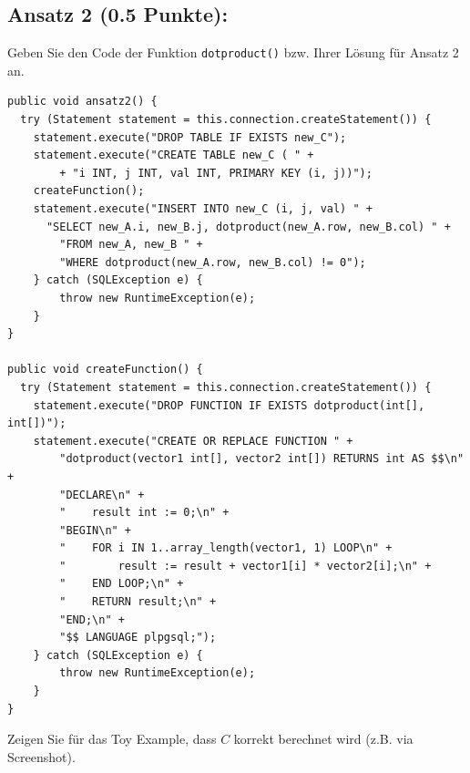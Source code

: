 \documentclass[11pt]{scrartcl}
\begin{document}
\subsection*{Ansatz 2 (0.5 Punkte):}

Geben Sie den Code der Funktion \texttt{dotproduct()} bzw. Ihrer Lösung für Ansatz 2 an.

\begin{lstlisting}[style=dmrsql]
public void ansatz2() {
  try (Statement statement = this.connection.createStatement()) {
    statement.execute("DROP TABLE IF EXISTS new_C");
    statement.execute("CREATE TABLE new_C ( " +
        + "i INT, j INT, val INT, PRIMARY KEY (i, j))");
    createFunction();
    statement.execute("INSERT INTO new_C (i, j, val) " +
      "SELECT new_A.i, new_B.j, dotproduct(new_A.row, new_B.col) " +
        "FROM new_A, new_B " +
        "WHERE dotproduct(new_A.row, new_B.col) != 0");
    } catch (SQLException e) {
        throw new RuntimeException(e);
    }
}

public void createFunction() {
  try (Statement statement = this.connection.createStatement()) {
    statement.execute("DROP FUNCTION IF EXISTS dotproduct(int[], int[])");
    statement.execute("CREATE OR REPLACE FUNCTION " +
        "dotproduct(vector1 int[], vector2 int[]) RETURNS int AS $$\n" +
        "DECLARE\n" +
        "    result int := 0;\n" +
        "BEGIN\n" +
        "    FOR i IN 1..array_length(vector1, 1) LOOP\n" +
        "        result := result + vector1[i] * vector2[i];\n" +
        "    END LOOP;\n" +
        "    RETURN result;\n" +
        "END;\n" +
        "$$ LANGUAGE plpgsql;");
    } catch (SQLException e) {
        throw new RuntimeException(e);
    }
}
\end{lstlisting}

Zeigen Sie für das Toy Example, dass $C$ korrekt berechnet wird (z.B. via Screenshot).
\end{document}
